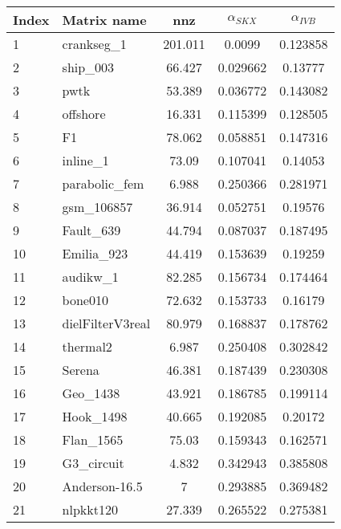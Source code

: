 \begin{tabular}{|l|l|S[round-mode=places,round-precision=2]|S[round-mode=places,round-precision=4]|S[round-mode=places,round-precision=4]|}
\toprule
{Index} & {Matrix name} &  {nnz} & {$\alpha_{SKX}$} & {$\alpha_{IVB}$}  \\
\midrule
{1}	& {	crankseg\_1                }	& 201.011	& 0.0099	& 0.123858	\\
{2}	& {	ship\_003                  }	& 66.427	& 0.029662	& 0.13777	\\
{3}	& {	pwtk                      }	& 53.389	& 0.036772	& 0.143082	\\
{4}	& {	offshore                  }	& 16.331	& 0.115399	& 0.128505	\\
{5}	& {	F1                        }	& 78.062	& 0.058851	& 0.147316	\\
{6}	& {	inline\_1                  }	& 73.09	& 0.107041	& 0.14053	\\
{7}	& {	parabolic\_fem             }	& 6.988	& 0.250366	& 0.281971	\\
{8}	& {	gsm\_106857                }	& 36.914	& 0.052751	& 0.19576	\\
{9}	& {	Fault\_639                 }	& 44.794	& 0.087037	& 0.187495	\\
{10}	& {	Emilia\_923                }	& 44.419	& 0.153639	& 0.19259	\\
{11}	& {	audikw\_1                  }	& 82.285	& 0.156734	& 0.174464	\\
{12}	& {	bone010                   }	& 72.632	& 0.153733	& 0.16179	\\
{13}	& {	dielFilterV3real          }	& 80.979	& 0.168837	& 0.178762	\\
{14}	& {	thermal2                  }	& 6.987	& 0.250408	& 0.302842	\\
{15}	& {	Serena                    }	& 46.381	& 0.187439	& 0.230308	\\
{16}	& {	Geo\_1438                  }	& 43.921	& 0.186785	& 0.199114	\\
{17}	& {	Hook\_1498                 }	& 40.665	& 0.192085	& 0.20172	\\
{18}	& {	Flan\_1565                 }	& 75.03	& 0.159343	& 0.162571	\\
{19}	& {	G3\_circuit                }	& 4.832	& 0.342943	& 0.385808	\\
{20}	& {	Anderson-16.5             }	& 7	& 0.293885	& 0.369482	\\
{21}	& {	nlpkkt120                 }	& 27.339	& 0.265522	& 0.275381	\\

\end{tabular}
